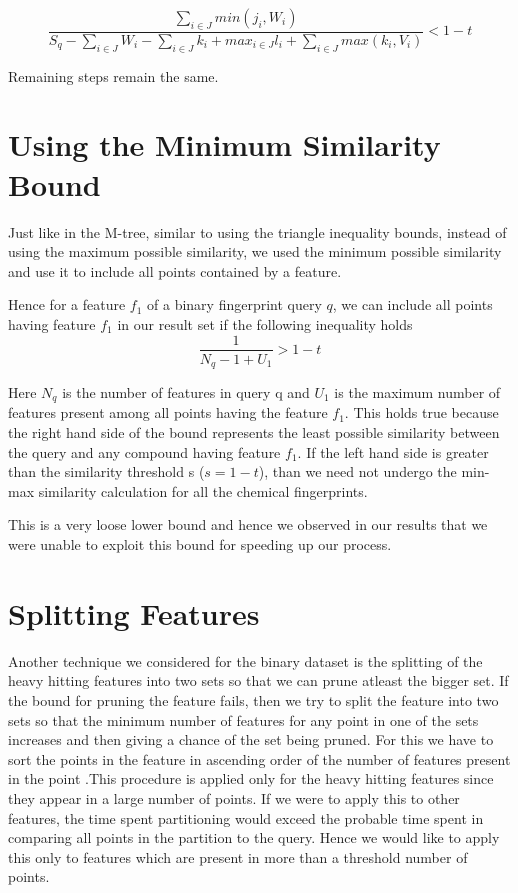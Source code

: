 \begin{equation}
\label{nonbineq2}
\frac{\sum\limits_{i \in J}min(j_i,W_i)}{S_q - \sum\limits_{i \in J}W_i -\sum\limits_{i \in J}k_i + max_{i \in J}l_i + \sum\limits_{i \in J}max (k_i, V_i)}  < 1-t
\end{equation}	

Remaining steps remain the same.

\section{Using the Minimum Similarity Bound}

Just like in the M-tree, similar to using the triangle inequality bounds, instead of using the maximum possible similarity, we used the minimum possible similarity and use it to include all points contained by a feature.

Hence for a feature $f_1$ of a binary fingerprint query $q$, we can include all points having feature $f_1$ in our result set if the following inequality holds
\begin{equation}
\frac{1}{N_q - 1 + U_{1}}  > 1-t
\end{equation}

Here $N_q$ is the number of features in query q and $U_{1}$ is the maximum number of features present among all points having the feature $f_1$. This holds true because the right hand side of the bound represents the least possible similarity between the query and any compound having feature $f_1$. If the left hand side is greater than the similarity threshold s ($s=1-t$), than we need not undergo the min-max similarity calculation for all the chemical fingerprints.

This is a very loose lower bound and hence we observed in our results that we were unable to exploit this bound for speeding up our process.
	


\section{Splitting Features}

Another technique we considered for the binary dataset is the splitting of the heavy hitting features into two sets so that we can prune atleast the bigger set. If the bound for pruning the feature fails, then we try to split the feature into two sets so that the minimum number of features for any point in one of the sets increases and then giving a chance of the set being pruned. For this we have to sort the points in the feature in ascending order of the number of features present in the point .This procedure is applied only for the heavy hitting features since they appear in a large number of points. If we were to apply this to other features, the time spent partitioning would exceed the probable time spent in comparing all points in the partition to the query. Hence we would like to apply this only to features which are present in more than a threshold number of points.\\

